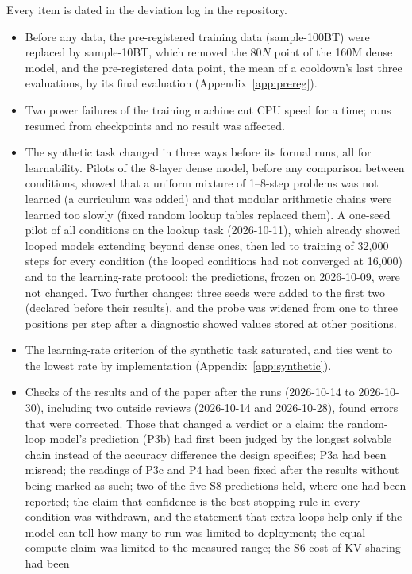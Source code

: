 Every item is dated in the deviation log in the repository.
\begin{itemize}
  \item Before any data, the pre-registered training data (sample-100BT) were replaced by sample-10BT, which removed the
  $80N$ point of the 160M dense model, and the pre-registered data point, the mean of a cooldown's last three
  evaluations, by its final evaluation (Appendix~\ref{app:prereg}).
  \item Two power failures of the training machine cut CPU speed for a time; runs resumed from checkpoints and no result
  was affected.
  \item The synthetic task changed in three ways before its formal runs, all for learnability. Pilots of the 8-layer dense
  model, before any comparison between conditions, showed that a uniform mixture of 1--8-step problems was not learned (a
  curriculum was added) and that modular arithmetic chains were learned too slowly (fixed random lookup tables replaced
  them). A one-seed pilot of all conditions on the lookup task (2026-10-11), which already showed looped models extending
  beyond dense ones, then led to training of 32{,}000 steps for every condition (the looped conditions had not converged at
  16{,}000) and to the learning-rate protocol; the predictions, frozen on 2026-10-09, were not changed. Two further changes: three
  seeds were added to the first two (declared before their results), and the probe was widened from one to three positions per step after a diagnostic showed values stored at other positions.
  \item The learning-rate criterion of the synthetic task saturated, and ties went to the lowest rate by implementation
  (Appendix~\ref{app:synthetic}).
  \item Checks of the results and of the paper after the runs (2026-10-14 to 2026-10-30), including two outside
  reviews (2026-10-14 and 2026-10-28), found errors that were corrected. Those that changed a verdict or a claim: the random-loop model's prediction
  (P3b) had first been judged by the longest solvable chain instead of the accuracy difference the design specifies; P3a
  had been misread; the readings of P3c and P4 had been fixed after the results without being marked as such; two of
  the five S8 predictions held, where one had been reported; the claim that confidence is the best stopping rule in
  every condition was withdrawn, and the statement that extra loops help only if the model can tell how many to run was
  limited to deployment; the equal-compute claim was limited to the measured range; the S6 cost of KV sharing had been

\end{itemize}
